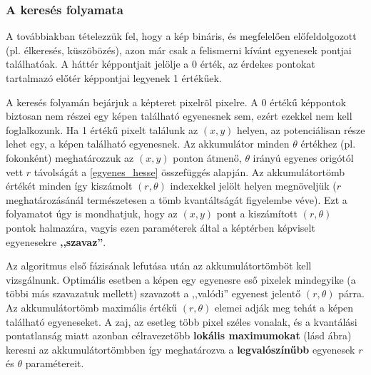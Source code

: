 \subsubsection{A keresés folyamata}\label{sect:kereses_folyamata}

A továbbiakban tételezzük fel, hogy a kép bináris, és megfelelően előfeldolgozott (pl. élkeresés, küszöbözés), azon már csak a felismerni kívánt egyenesek pontjai találhatóak. A háttér képpontjait jelölje a 0 érték, az érdekes pontokat tartalmazó előtér képpontjai legyenek 1 értékűek.

A keresés folyamán bejárjuk a képteret pixelrõl pixelre. A 0 értékű képpontok biztosan nem részei egy képen található egyenesnek sem, ezért ezekkel nem kell foglalkozunk. Ha 1 értékű pixelt találunk az $ (x,y) $ helyen, az potenciálisan része lehet egy, a képen található egyenesnek. Az akkumulátor minden $ \theta $ értékhez (pl. fokonként) meghatározzuk az $ (x,y) $ ponton átmenő, $ \theta $ irányú egyenes origótól vett $ r $ távolságát a \eqref{egyenes_hesse} összefüggés alapján. Az akkumulátortömb értékét minden így kiszámolt $ (r,\theta) $ indexekkel jelölt helyen megnöveljük ($ r $ meghatározásánál természetesen a tömb kvantáltságát figyelembe véve). Ezt a folyamatot úgy is mondhatjuk, hogy az $ (x,y) $ pont a kiszámított $ (r, \theta) $ pontok halmazára, vagyis ezen paraméterek által a képtérben képviselt egyenesekre \textbf{,,szavaz''}.

Az algoritmus első fázisának lefutása után az akkumulátortömböt kell vizsgálnunk. Optimális esetben a képen egy egyenesre eső pixelek mindegyike (a többi más szavazatuk mellett) szavazott a ,,valódi'' egyenest jelentő $ (r, \theta) $ párra. Az akkumulátortömb maximális értékű $ (r, \theta) $ elemei adják meg tehát a képen található egyeneseket. A zaj, az esetleg több pixel széles vonalak, és a kvantálási pontatlanság miatt azonban célravezetőbb \textbf{lokális maximumokat} (lásd  ábra) keresni az akkumulátortömbben így meghatározva a \textbf{legvalószínűbb} egyenesek $ r $ és $ \theta $ paramétereit.

